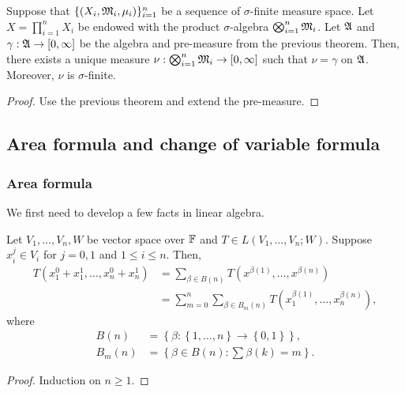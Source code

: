 \documentclass[a4paper]{article}
\begin{document}
\begin{cor}
Suppose that $\{(X_i, \mathfrak{M}_i, \mu_i)\}_{i=1}^n$ be
a sequence of $\sigma$-finite measure space.
Let $X = \prod_{i=1}^n X_i$ be endowed with the product
$\sigma$-algebra $\bigotimes_{i=1}^n \mathfrak{M}_i$. Let $\mathfrak{A}$
and $\gamma: \mathfrak{A} \to [0, \infty]$ be the algebra and
pre-measure from the previous theorem. Then, there
exists a unique measure $\nu: \bigotimes_{i=1}^n \mathfrak{M}_i
\to [0, \infty]$ such that $\nu = \gamma$ on $\mathfrak{A}$.
Moreover, $\nu$ is $\sigma$-finite.
\end{cor}

\begin{proof}
Use the previous theorem and extend the pre-measure.
\end{proof}

\subsection{Area formula and change of variable formula}

\subsubsection{Area formula}

We first need to develop a few facts in linear algebra.

\begin{prop}
Let $V_1, \dots, V_n, W$ be vector space over $\mathbb{F}$
and $T \in L(V_1, \dots, V_n ; W)$. Suppose $x_i^j \in V_i$
for $j = 0, 1$ and $1 \leq i \leq n$. Then,
\[
\begin{aligned}
  T(x^0_1 + x^1_1, \dots, x^0_n + x^1_n)
  &= \sum_{\beta \in B(n)}
  T(x^{\beta(1)}, \dots, x^{\beta(n)}) \\
  &= \sum_{m=0}^n \sum_{\beta \in B_m(n)}
  T(x_1^{\beta(1)}, \dots, x_n^{\beta(n)}),
\end{aligned}
\]
where
\[
\begin{aligned}
  B(n) &= \left\{ \beta : \left\{ 1, \dots, n \right\}
  \to \left\{ 0, 1 \right\} \right\}, \\
  B_m(n) &= \left\{ \beta \in B(n) :
  \sum \beta(k) = m \right\}.
\end{aligned}
\]
\end{prop}

\begin{proof}
Induction on $n \geq 1$.
\end{proof}
\end{document}
